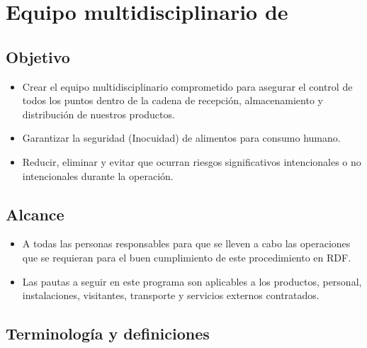 \thispagestyle{formato-PI}
\renewcommand{\MayorVer}{2}
\renewcommand{\MenorVer}{0}
\renewcommand{\Codigo}{FD-1-MAN}
\renewcommand{\FechaPub}{2023--01}
\renewcommand{\Titulo}{Equipo multidisciplinario de \textit{}}

\section{\Titulo} \label{ESP:EquipoFoodDefense}

\subsection{Objetivo}
\begin{itemize}
	\item Crear el equipo multidisciplinario comprometido para asegurar el control de todos los puntos dentro de la cadena de recepción, almacenamiento y distribución de nuestros productos.
	\item Garantizar la seguridad (Inocuidad) de alimentos para consumo humano.
	\item Reducir, eliminar y evitar que ocurran riesgos significativos intencionales o no intencionales durante la operación.
\end{itemize}

\subsection{Alcance}
\begin{itemize}
	\item A todas las personas responsables para que se lleven a cabo las operaciones que se requieran para el buen cumplimiento de este procedimiento en \gls{RDF}.
	\item Las pautas a seguir en este programa son aplicables a los productos, personal, instalaciones, visitantes, transporte y servicios externos contratados.
\end{itemize}

\subsection{Terminología y definiciones}

\begin{description}
\end{description}

